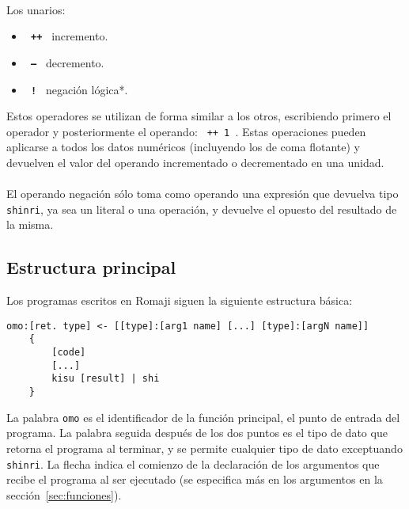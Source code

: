 \documentclass[spanish]{article}
\begin{document}
\hspace{0pt}\\
Los unarios:
\begin{itemize}
  \item{ \texttt{\textbf{ ++ }} incremento. }
  \item{ \texttt{\textbf{ -- }} decremento. }
  \item{ \texttt{\textbf{ ! }} negación lógica*. }
\end{itemize}
Estos operadores se utilizan de forma similar a los otros, escribiendo primero el operador y posteriormente el operando: \texttt{ ++ 1 }. Estas operaciones pueden aplicarse a todos los datos numéricos (incluyendo los de coma flotante) y devuelven el valor del operando incrementado o decrementado en una unidad.\\
\hspace{0pt}\\
\text{*}El operando negación sólo toma como operando una expresión que devuelva tipo \texttt{shinri}, ya sea un literal o una operación, y devuelve el opuesto del resultado de la misma.

\subsection{Estructura principal}
\label{sec:estructura-principal}

Los programas escritos en Romaji siguen la siguiente estructura básica:
\begin{lstlisting}[language=Romaji]
    omo:[ret. type] <- [[type]:[arg1 name] [...] [type]:[argN name]]
    {
        [code]
        [...]
        kisu [result] | shi
    }
\end{lstlisting}

La palabra \texttt{omo} es el identificador de la función principal, el punto de entrada del programa.
La palabra seguida después de los dos puntos es el tipo de dato que retorna el programa al terminar, y se permite cualquier tipo de dato exceptuando \texttt{shinri}.
La flecha indica el comienzo de la declaración de los argumentos que recibe el programa al ser ejecutado (se especifica más en los argumentos en la sección~\ref{sec:funciones}).\\
\end{document}
